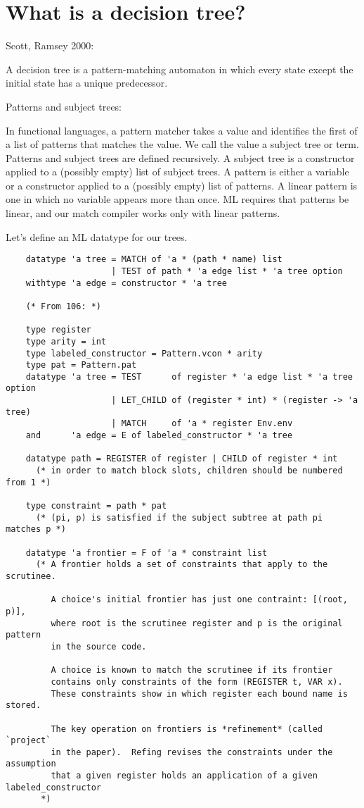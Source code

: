 \documentclass{article}
\begin{document}
\section{What is a decision tree?}
Scott, Ramsey 2000: 

A decision tree is a pattern-matching automaton in which every state except the
initial state has a unique predecessor. 

Patterns and subject trees: 

In functional languages, a pattern matcher takes a value and identifies the
first of a list of patterns that matches the value. We call the value a subject
tree or term. Patterns and subject trees are defined recursively. A subject tree
is a constructor applied to a (possibly empty) list of subject trees. A pattern
is either a variable or a constructor applied to a (possibly empty) list of
patterns. A linear pattern is one in which no variable appears more than once.
ML requires that patterns be linear, and our match compiler works only with
linear patterns. 


Let's define an ML datatype for our trees. 
\begin{verbatim}
    datatype 'a tree = MATCH of 'a * (path * name) list 
                     | TEST of path * 'a edge list * 'a tree option 
    withtype 'a edge = constructor * 'a tree 

    (* From 106: *)

    type register
    type arity = int
    type labeled_constructor = Pattern.vcon * arity
    type pat = Pattern.pat
    datatype 'a tree = TEST      of register * 'a edge list * 'a tree option
                     | LET_CHILD of (register * int) * (register -> 'a tree)
                     | MATCH     of 'a * register Env.env
    and      'a edge = E of labeled_constructor * 'a tree
  
    datatype path = REGISTER of register | CHILD of register * int
      (* in order to match block slots, children should be numbered from 1 *)
  
    type constraint = path * pat
      (* (pi, p) is satisfied if the subject subtree at path pi matches p *)
  
    datatype 'a frontier = F of 'a * constraint list
      (* A frontier holds a set of constraints that apply to the scrutinee.
  
         A choice's initial frontier has just one contraint: [(root, p)],
         where root is the scrutinee register and p is the original pattern
         in the source code.
  
         A choice is known to match the scrutinee if its frontier
         contains only constraints of the form (REGISTER t, VAR x).
         These constraints show in which register each bound name is stored.
      
         The key operation on frontiers is *refinement* (called `project`
         in the paper).  Refing revises the constraints under the assumption
         that a given register holds an application of a given labeled_constructor 
       *)
  
  
\end{verbatim}
\end{document}
